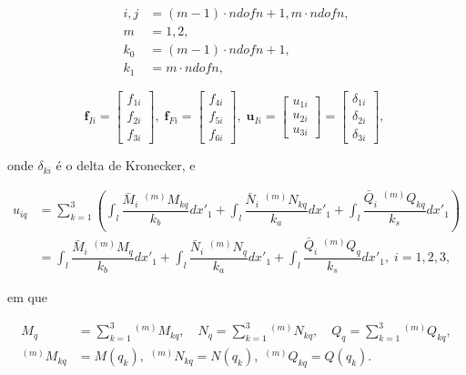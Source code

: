 \begin{align}
	i,j & = (m-1)\cdot ndofn + 1, m\cdot ndofn, \\ \nonumber
	m   & = 1,2,                                \\ \nonumber
	k_0 & = (m-1)\cdot ndofn +1,                \\ \nonumber
	k_1 & = m \cdot ndofn,
\end{align}

\begin{equation}
	\mathbf{f}_{Ii} =
	\begin{bmatrix}
		f_{1i} \\
		f_{2i} \\
		f_{3i}
	\end{bmatrix}, \;
	\mathbf{f}_{Fi} =
	\begin{bmatrix}
		f_{4i} \\
		f_{5i} \\
		f_{6i}
	\end{bmatrix}, \;
	\mathbf{u}_{Ii} =
	\begin{bmatrix}
		u_{1i} \\
		u_{2i} \\
		u_{3i}
	\end{bmatrix} =
	\begin{bmatrix}
		\delta_{1i} \\
		\delta_{2i} \\
		\delta_{3i}
	\end{bmatrix}, \;
\end{equation}

onde $\delta_{ki}$ é o delta de Kronecker, e

\begin{align}
	u_{iq}
	 & =\sum_{k=1}^3 \left( \int_l \dfrac{\bar{M}_i\,\, ^{(m)}M_{kq}}{k_b} dx'_1 + \int_l \dfrac{\bar{N}_i\,\, ^{(m)}N_{kq}}{k_a} dx'_1 + \int_l \dfrac{\bar{Q}_i\,\, ^{(m)}Q_{kq}}{k_s} dx'_1 \right) \\
	 & = \int_l \dfrac{\bar{M}_i\,\, ^{(m)}M_{q}}{k_b} dx'_1 + \int_l \dfrac{\bar{N}_i\,\, ^{(m)}N_{q}}{k_a} dx'_1 + \int_l \dfrac{\bar{Q}_i\,\, ^{(m)}Q_{q}}{k_s} dx'_1 ,
	\; i=1,2,3,\,\,\,
\end{align}

em que

\begin{align}
	M_{q} & =\sum_{k=1}^3 {^{(m)}M_{kq}},\quad N_{q}=\sum_{k=1}^3 {^{(m)}N_{kq}},\quad Q_{q}=\sum_{k=1}^3  {^{(m)}Q_{kq}}, \\   \nonumber
	                                                                                                                            ^{(m)}M_{kq}&= M(q_k),\,\, ^{(m)}N_{kq} = N(q_k),\,\, ^{(m)}Q_{kq} = Q(q_k).
\end{align}

